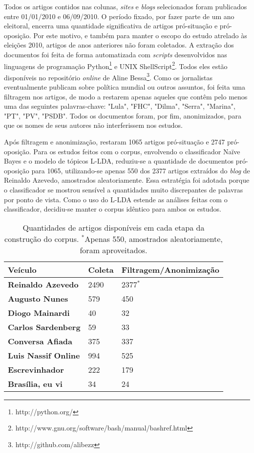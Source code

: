 Todos os artigos contidos nas colunas, \emph{sites} e \emph{blogs} selecionados foram  publicados entre 01/01/2010 e 06/09/2010. O período fixado, por fazer parte de um ano eleitoral, encerra uma quantidade significativa de artigos pró-situação e pró-oposição. Por este motivo, e também para manter o escopo do estudo atrelado às eleições 2010, artigos de anos anteriores não foram coletados. A extração dos documentos foi feita de forma automatizada com \emph{scripts} desenvolvidos nas linguagens de programação Python\footnote{http://python.org/} e UNIX ShellScript\footnote{http://www.gnu.org/software/bash/manual/bashref.html}. Todos eles estão disponíveis no repositório \emph{online} de Aline Bessa\footnote{http://github.com/alibezz}. Como os jornalistas eventualmente publicam sobre política mundial ou outros assuntos, foi feita uma filtragem nos artigos, de modo a restarem apenas aqueles que contêm pelo menos uma das seguintes palavras-chave: "Lula", "FHC", "Dilma", "Serra", "Marina", "PT", "PV", "PSDB". Todos os documentos foram, por fim, anonimizados, para que os nomes de seus autores não interferissem nos estudos. 

Após filtragem e anonimização, restaram 1065 artigos pró-situação e 2747 pró-oposição. Para os estudos feitos com o corpus, envolvendo o classificador Naïve Bayes e o modelo de tópicos L-LDA, reduziu-se a quantidade de documentos pró-oposição para 1065, utilizando-se apenas 550 dos 2377 artigos extraídos do \emph{blog} de Reinaldo Azevedo, amostrados aleatoriamente. Essa estratégia foi adotada porque o classificador se mostrou sensível a quantidades muito discrepantes de palavras por ponto de vista. Como o uso do L-LDA estende as análises feitas com o classificador, decidiu-se manter o corpus idêntico para ambos os estudos. 

\begin{table}[t]
\centering
\begin{tabular}{| l | l | p{5cm} | }
\hline

\textbf{Veículo} & \textbf{Coleta} & \textbf{Filtragem/Anonimização} \\ \hline

\textbf{Reinaldo Azevedo} & 2490 & 2377\ensuremath{^*} \\ \hline
\textbf{Augusto Nunes} & 579 & 450 \\ \hline
\textbf{Diogo Mainardi} & 40 & 32 \\ \hline
\textbf{Carlos Sardenberg} & 59 & 33  \\ \hline
\textbf{Conversa Afiada} & 375 & 337  \\ \hline
\textbf{Luis Nassif Online} & 994 & 525 \\ \hline
\textbf{Escrevinhador} & 222 & 179  \\ \hline
\textbf{Brasília, eu vi} & 34 & 24  \\ \hline
\end{tabular}
\label{tab1:estudo}
\caption{Quantidades de artigos disponíveis em cada etapa da construção do corpus. \ensuremath{^*}Apenas 550, amostrados aleatoriamente, foram aproveitados.}
\end{table}


